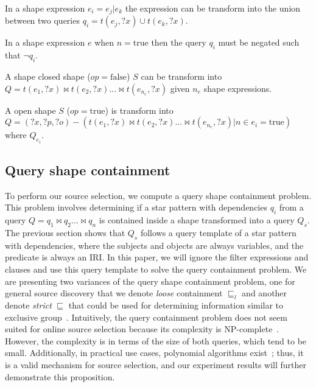 \begin{prop}
   In a shape expression $e_i = e_j|e_k$ the expression can be transform into the union between two queries
   $q_{i} = t(e_j, ?x) \cup t(e_k, ?x)$.
\end{prop}

\begin{prop}
   In a shape expression $e$ when $n= \mathrm{true}$ then the query $q_i$ must be negated such that $\neg q_i$.
\end{prop}

\begin{prop}
   A shape closed shape ($op = \mathrm{false}$) $S$ can be transform into $Q = t(e_1, ?x) \bowtie t(e_2, ?x) ... \bowtie t(e_{n_e}, ?x)$ given $n_e$ shape expressions.
\end{prop}

\begin{prop}
   A open shape $S$ ($op = \mathrm{true}$) is transform into $Q = (?x, ?p, ?o) -  (t(e_1, ?x) \bowtie  t(e_2, ?x) ... \bowtie t(e_{n_e}, ?x)| n\in e_i = \mathrm{true}) $ where $Q_{e_i}$.
\end{prop}

\subsection{Query shape containment}\label{sec:containment}

To perform our source selection, we compute a query shape containment problem. 
This problem involves determining if a star pattern with dependencies $q_i$ from a query $Q = q_1 \bowtie q_2 ... \bowtie q_n$ is contained inside a shape transformed into a query $Q_s$. 
The previous section shows that $Q_s$ follows a query template of a star pattern with dependencies, where the subjects and objects are always variables, and the predicate is always an IRI.
In this paper, we will ignore the filter expressions and clauses and use this query template to solve the query containment problem.
We are presenting two variances of the query shape containment problem, one for general source discovery that we denote \emph{loose} containment $\sqsubseteq_l$ and 
another denote \emph{strict} $\sqsubseteq$ that could be used for determining information similar to exclusive group~\cite{Schwarte2011}. 
Intuitively, the query containment problem does not seem suited for online source selection because its complexity is NP-complete~\cite{Spasi2023}.
However, the complexity is in terms of the size of both queries, which tend to be small.
Additionally, in practical use cases, polynomial algorithms exist~\cite{Doan2012}; 
thus, it is a valid mechanism for source selection, and our experiment results will further demonstrate this proposition.

